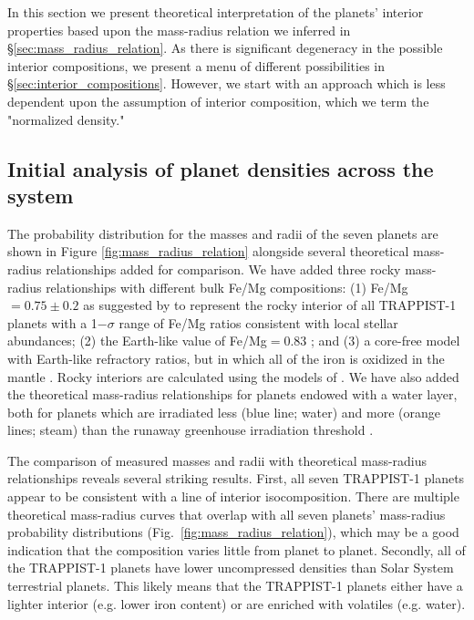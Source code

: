 \documentclass[twocolumn]{aastex63}
\begin{document}
In this section we present theoretical interpretation of the planets'
interior properties based upon the mass-radius relation we inferred in \S \ref{sec:mass_radius_relation}.  As there is significant degeneracy in the possible interior compositions, we present a menu of different possibilities in \S \ref{sec:interior_compositions}.  However, we start with an approach which is less dependent upon the assumption of interior composition, which we term the "normalized density."

\subsection{Initial analysis of planet densities across the system}

The probability distribution for the masses and radii of the seven planets are shown in Figure \ref{fig:mass_radius_relation} alongside several theoretical mass-radius relationships added for comparison. 
We have added three rocky mass-radius relationships with different bulk Fe/Mg compositions:  (1) Fe/Mg$ =0.75{\pm} 0.2$ as suggested by \citet{Unterborn2018a} to represent the rocky interior of all TRAPPIST-1 planets with a 1$-\sigma$ range of Fe/Mg ratios consistent with local stellar abundances;  (2) the Earth-like value of Fe/Mg$ = 0.83$ \citep{Lodders2009}; and (3) a core-free model with Earth-like refractory ratios, but in which all of the iron is oxidized in the mantle \citep{ElkinsTanton2008}. Rocky interiors are calculated using the models of \citet{Dorn2016}. We have also added the theoretical mass-radius relationships for planets endowed with a water layer, both for planets which are irradiated less (blue line; water) and more (orange lines; steam) than the runaway greenhouse irradiation threshold \citep{Turbet2020}.

The comparison of measured masses and radii with theoretical mass-radius relationships reveals several striking results. First, all seven TRAPPIST-1 planets appear to be consistent with a line of interior isocomposition. There are multiple theoretical mass-radius curves that overlap with all seven planets' mass-radius probability distributions (Fig.\ \ref{fig:mass_radius_relation}), which may be a good indication that the composition varies little from planet to planet. Secondly, all of the TRAPPIST-1 planets have lower uncompressed densities than Solar System terrestrial planets. This likely means that the TRAPPIST-1 planets either have a lighter interior (e.g. lower iron content) or are enriched with volatiles (e.g. water).
\end{document}
